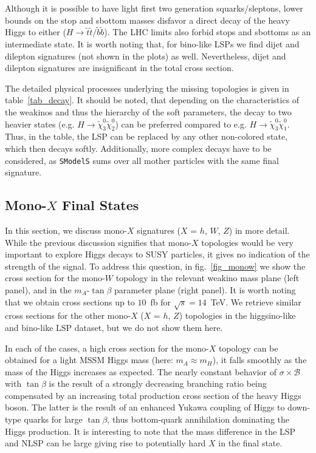 \documentclass[11pt,a4paper]{article}
\begin{document}
Although it is possible to have light first two generation squarks/sleptons, lower bounds on the stop and sbottom masses disfavor a direct decay of the heavy Higgs to either ($H\rightarrow\tilde{t}\tilde{t}/\tilde{b}\tilde{b}$). The LHC limits also forbid stops and sbottoms as an intermediate state. It is worth noting that, for bino-like LSPs we find dijet and dilepton signatures (not shown in the plots) as well. Nevertheless, dijet and dilepton signatures are insignificant in the total cross section.

The detailed physical processes underlying the missing topologies is given in table~\ref{tab_decay}. It should be noted, that depending on the characteristics of the weakinos and thus the hierarchy of the soft parameters, the decay to two heavier states (e.g. $H\rightarrow \tilde{\chi}^0_3\tilde{\chi}^0_2$) can be preferred compared to e.g. $H\rightarrow \tilde{\chi}^0_3\tilde{\chi}^0_1$. Thus, in the table, the LSP can be replaced by any other non-colored state, which then decays softly. Additionally, more complex decays have to be considered, as \texttt{SModelS} sums over all mother particles with the same final signature.

\subsection*{Mono-$X$ Final States}
In this section, we discuss mono-$X$ signatures ($X$ = $h$, $W$, $Z$) in more detail. While the previous discussion signifies that mono-$X$ topologies would be very important to explore Higgs decays to SUSY particles, it gives no indication of the strength of the signal. To address this question, in fig.~\ref{fig_monow} we show the cross section for the mono-$W$ topology in the relevant weakino mass plane (left panel), and in the $m_A$-$\tan\beta$ parameter plane (right panel). It is worth noting that we obtain cross sections up to $10$~fb for $\sqrt{s}=14$~TeV. We retrieve similar cross sections for the other mono-$X$ ($X$ = $h$, $Z$) topologies in the higgsino-like and bino-like LSP dataset, but we do not show them here.

In each of the cases, a high cross section for the mono-$X$ topology can be obtained for a light MSSM Higgs mass (here: $m_A\approx m_H$), it falls smoothly as the mass of the Higgs increases as expected. The nearly constant behavior of $\sigma\times\mathcal{B}$ with $\tan\beta$ is the result of a strongly decreasing branching ratio being compensated by an increasing total production cross section of the heavy Higgs boson. The latter is the result of an enhanced Yukawa coupling of Higgs to down-type quarks for large $\tan\beta$, thus bottom-quark annihilation dominating the Higgs production. It is interesting to note that the mass difference in the LSP and NLSP can be large giving rise to potentially hard $X$ in the final state. 
\end{document}
